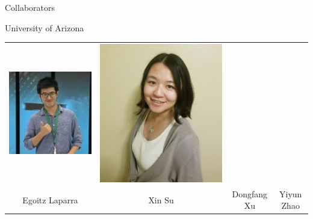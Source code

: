 \documentclass[14pt]{beamer}
\begin{document}
\begin{frame}{Collaborators}
\begin{block}{University of Arizona}
\begin{tabular}{c c c c }
\includegraphics[height=0.2\textheight]{Dongfang.jpg} &
\includegraphics[height=0.2\textheight]{Yiyun.jpg} \\
Egoitz Laparra & Xin Su & Dongfang Xu & Yiyun Zhao
\end{tabular}
\end{block}


\end{frame}
\end{document}
